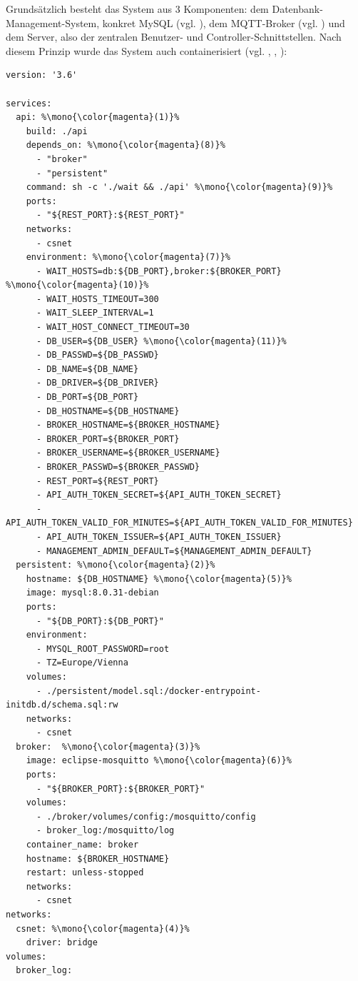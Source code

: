 \noindent
Grundsätzlich besteht das System aus 3 Komponenten: dem Datenbank-Management-System, konkret MySQL (vgl. \cite{mysql:docker-image}), dem MQTT-Broker (vgl. \cite{mosquitto:docker-image}) und dem Server, also der zentralen Benutzer- und Controller-Schnittstellen. Nach diesem Prinzip wurde das System auch containerisiert (vgl. \cite{impl:docker-compose:1}, \cite{impl:docker-compose:3}, \cite{impl:docker-compose:4}):
\begin{lstlisting}[style=goMono, caption={docker-compose.yml}, label={lst:impl:docker-compose}]
version: '3.6'

services:
  api: %\mono{\color{magenta}(1)}%
    build: ./api
    depends_on: %\mono{\color{magenta}(8)}%
      - "broker"
      - "persistent"
    command: sh -c './wait && ./api' %\mono{\color{magenta}(9)}%
    ports:
      - "${REST_PORT}:${REST_PORT}"
    networks:
      - csnet
    environment: %\mono{\color{magenta}(7)}%
      - WAIT_HOSTS=db:${DB_PORT},broker:${BROKER_PORT} %\mono{\color{magenta}(10)}%
      - WAIT_HOSTS_TIMEOUT=300
      - WAIT_SLEEP_INTERVAL=1
      - WAIT_HOST_CONNECT_TIMEOUT=30
      - DB_USER=${DB_USER} %\mono{\color{magenta}(11)}%
      - DB_PASSWD=${DB_PASSWD}
      - DB_NAME=${DB_NAME}
      - DB_DRIVER=${DB_DRIVER}
      - DB_PORT=${DB_PORT}
      - DB_HOSTNAME=${DB_HOSTNAME}
      - BROKER_HOSTNAME=${BROKER_HOSTNAME}
      - BROKER_PORT=${BROKER_PORT}
      - BROKER_USERNAME=${BROKER_USERNAME}
      - BROKER_PASSWD=${BROKER_PASSWD}
      - REST_PORT=${REST_PORT}
      - API_AUTH_TOKEN_SECRET=${API_AUTH_TOKEN_SECRET}
      - API_AUTH_TOKEN_VALID_FOR_MINUTES=${API_AUTH_TOKEN_VALID_FOR_MINUTES}
      - API_AUTH_TOKEN_ISSUER=${API_AUTH_TOKEN_ISSUER}
      - MANAGEMENT_ADMIN_DEFAULT=${MANAGEMENT_ADMIN_DEFAULT}
  persistent: %\mono{\color{magenta}(2)}%
    hostname: ${DB_HOSTNAME} %\mono{\color{magenta}(5)}%
    image: mysql:8.0.31-debian
    ports:
      - "${DB_PORT}:${DB_PORT}"
    environment:
      - MYSQL_ROOT_PASSWORD=root
      - TZ=Europe/Vienna
    volumes:
      - ./persistent/model.sql:/docker-entrypoint-initdb.d/schema.sql:rw
    networks:
      - csnet
  broker:  %\mono{\color{magenta}(3)}%
    image: eclipse-mosquitto %\mono{\color{magenta}(6)}%
    ports:
      - "${BROKER_PORT}:${BROKER_PORT}"
    volumes:
      - ./broker/volumes/config:/mosquitto/config
      - broker_log:/mosquitto/log
    container_name: broker
    hostname: ${BROKER_HOSTNAME}
    restart: unless-stopped
    networks:
      - csnet
networks: 
  csnet: %\mono{\color{magenta}(4)}%
    driver: bridge
volumes:
  broker_log:
\end{lstlisting}
